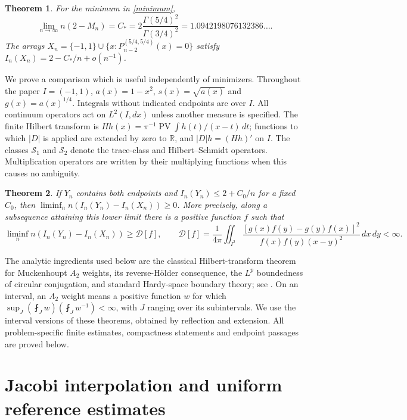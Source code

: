\documentclass[a4paper,11pt]{amsart}
\newtheorem{theorem}{Theorem}[section]
\theoremstyle{remark}\newtheorem{remark}[theorem]{Remark}
\newcommand{\PV}{\operatorname{PV}}
\newcommand{\HS}{\mathcal S_2}
\newcommand{\R}{\mathbb R}
\newcommand{\dd}{\,d}
\newcommand{\Cstar}{C_*}
\begin{document}
\begin{theorem}\label{main}
For the minimum in \eqref{minimum},
\begin{equation}\label{answer}
 \lim_{n\to\infty}n(2-M_n)
 =\Cstar=2\frac{\Gamma(5/4)^2}{\Gamma(3/4)^2}
 =1.0942198076132386\ldots.
\end{equation}
The arrays $X_n=\{-1,1\}\cup\{x:P_{n-2}^{(5/4,5/4)}(x)=0\}$
satisfy $I_n(X_n)=2-\Cstar/n+o(n^{-1})$.
\end{theorem}

We prove a comparison which is useful independently of minimizers.
Throughout the paper $I=(-1,1)$, $a(x)=1-x^2$, $s(x)=\sqrt{a(x)}$
and $g(x)=a(x)^{1/4}$. Integrals without indicated endpoints are over
$I$. All continuum operators act on $L^2(I,dx)$ unless another measure
is specified. The finite Hilbert transform is
$Hh(x)=\pi^{-1}\PV\int h(t)/(x-t)\dd t$; functions to which $|D|$
is applied are extended by zero to $\R$, and $|D|h=(Hh)'$ on $I$.
The classes $\mathcal S_1$ and $\HS$ denote the trace-class and
Hilbert--Schmidt operators. Multiplication operators are written by
their multiplying functions when this causes no ambiguity.

\begin{theorem}\label{comparison}
If $Y_n$ contains both endpoints and $I_n(Y_n)\le2+C_0/n$ for a fixed
$C_0$, then $\liminf_n n(I_n(Y_n)-I_n(X_n))\ge0$. More precisely,
along a subsequence attaining this lower limit there is a positive
function $f$ such that
\begin{equation}\label{defect}
 \liminf_n n(I_n(Y_n)-I_n(X_n))\ge\mathcal D[f],\qquad
 \mathcal D[f]=\frac1{4\pi}\iint_{I^2}
 \frac{[g(x)f(y)-g(y)f(x)]^2}{f(x)f(y)(x-y)^2}\dd x\dd y<\infty.
\end{equation}
\end{theorem}

The analytic ingredients used below are the classical Hilbert-transform
theorem for Muckenhoupt $A_2$ weights, its reverse-H\"older consequence,
the $L^p$ boundedness of circular conjugation, and standard Hardy-space
boundary theory; see \cite{hmw,gcrf,duren}. On an interval, an $A_2$
weight means a positive function $w$ for which
$\sup_J(\fint_Jw)(\fint_Jw^{-1})<\infty$, with $J$ ranging over its
subintervals. We use the interval versions of these theorems, obtained
by reflection and extension. All problem-specific finite estimates,
compactness statements and endpoint passages are proved below.

\section{Jacobi interpolation and uniform reference estimates}
\end{document}
